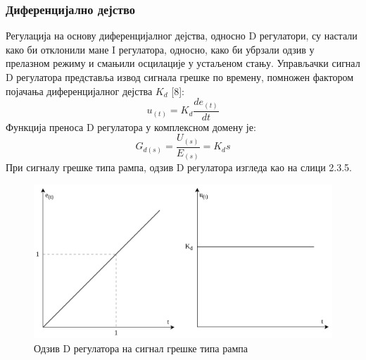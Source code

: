 \documentclass[12pt]{article}
\begin{document}
\subsubsection{Диференцијално дејство}
Регулација на основу диференцијалног дејства, односно D регулатори, су настали како би отклонили мане I регулатора, односно, како би убрзали одзив у прелазном режиму и смањили осцилације у устаљеном стању. Управљачки сигнал D регулатора представља извод сигнала грешке по времену, помножен фактором појачања диференцијалног дејства $K_d$ [8]:
\begin{equation}
    u_{(t)} = K_d\dfrac{de_{(t)}}{dt}
\end{equation}
Функција преноса D регулатора у комплексном домену је:
\begin{equation}
    G_{d(s)} = \dfrac{U_{(s)}}{E_{(s)}} = K_ds
\end{equation}
При сигналу грешке типа рампа, одзив D регулатора изгледа као на слици 2.3.5.
\begin{figure}[H]
    \centering
    \includegraphics[width=13cm]{figures/d.drawio.png}
    \caption{Одзив D регулатора на сигнал грешке типа рампа}
    \label{fig:D_одзив}
\end{figure}
\end{document}
